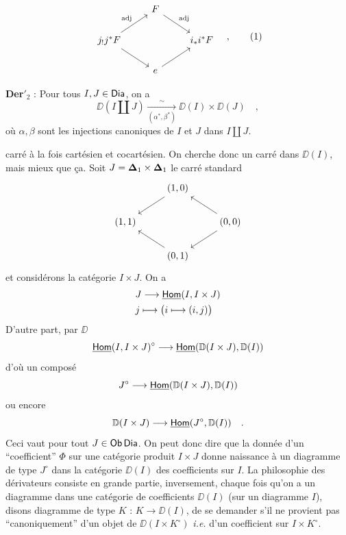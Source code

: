 \[
\begin{tikzcd}
& F \arrow[dr, "\mathrm{adj}"] & \\
j_!j^*F \arrow[ur, "\mathrm{adj}"] \arrow[dr] & & i_*i^*F \\
& e \arrow[ur] &
\end{tikzcd}
\quad ,
\tag*{(1)}
\]

\textbf{Der}$'_2$ : Pour tous $I, J \in \mathsf{Dia}$, on a
\[ \DD(I \amalg J) \xrightarrow[(\alpha^*, \beta^*)]{\sim} \DD(I) \times \DD(J) \quad , \]
où $\alpha, \beta$ sont les injections canoniques de $I$ et $J$ dans $I \amalg J$.


carré à la fois cartésien et cocartésien. On cherche donc un carré dans $\DD(I)$, mais mieux que ça. Soit $J = \boldsymbol{\Delta}_1 \times \boldsymbol{\Delta}_1$ le carré standard
\[
\begin{tikzcd}
& (1,0) \arrow[dl] & \\
(1,1) & & (0,0) \arrow[ul] \arrow[dl] \\
& (0,1) \arrow[ul] &
\end{tikzcd}
\]
et considérons la catégorie $I \times J$. On a
\[
\begin{aligned}
& J \longrightarrow \underline{\mathsf{Hom}}(I, I \times J) \\
& j \longmapsto \bigl(i \longmapsto (i,j)\bigr)
\end{aligned}
\]
D'autre part, par $\DD$
\[ \underline{\mathsf{Hom}}(I, I \times J)^{\circ} \longrightarrow \underline{\mathsf{Hom}}(\mathbb{D}(I \times J), \mathbb{D}(I)) \]
d'où un composé
\[ J^{\circ} \longrightarrow \underline{\mathsf{Hom}}(\mathbb{D}(I \times J), \mathbb{D}(I)) \]
ou encore
\[ \mathbb{D}(I \times J) \longrightarrow \underline{\mathsf{Hom}}(J^{\circ}, \mathbb{D}(I)) \quad . \]
Ceci vaut pour tout $J \in \mathsf{Ob} \, \mathsf{Dia}$. On peut donc dire que la donnée d'un “coefficient” $\Phi$ sur une catégorie produit $I \times J$ donne naissance à un diagramme de type $J^{\circ}$ dans la catégorie $\DD(I)$ des coefficients sur $I$. La philosophie
des dérivateurs consiste en grande partie, inversement, chaque fois qu'on a un diagramme dans une catégorie de coefficients $\DD(I)$ (sur un diagramme $I$), disons diagramme de type $K$ : $K \to \DD(I)$, de se demander s'il ne provient pas “canoniquement” d'un objet de $\DD(I \times K^{\circ})$ \textit{i.e.} d'un coefficient sur $I \times K^{\circ}$.

